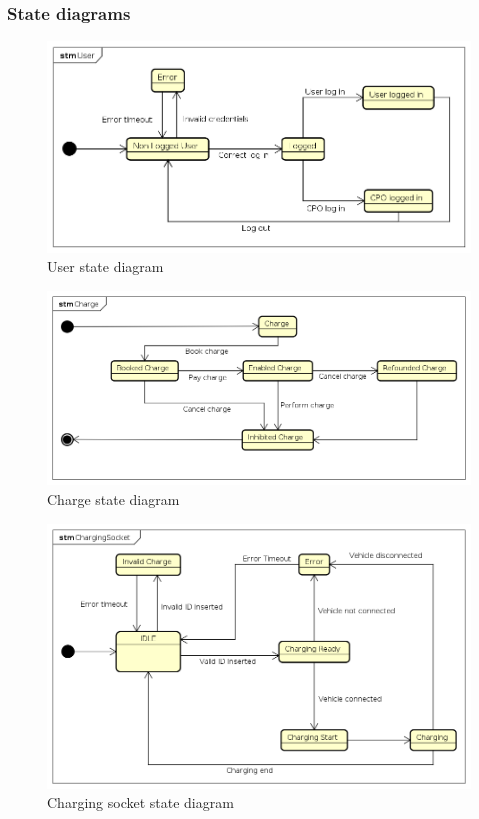 \subsubsection{State diagrams}
\begin{figure}[h!]
      \begin{center}
            \includegraphics[keepaspectratio, width=16cm]{StateDiagrams/User.png}
            \caption{User state diagram}
      \end{center}
\end{figure}
\begin{figure}[h!]
      \begin{center}
            \includegraphics[keepaspectratio, width=16cm]{StateDiagrams/Charge.png}
            \caption{Charge state diagram}
      \end{center}
\end{figure}
\begin{figure}[h!]
      \begin{center}
            \includegraphics[keepaspectratio, width=16cm]{StateDiagrams/ChargingSocket.png}
            \caption{Charging socket state diagram}
      \end{center}
\end{figure}
\clearpage

